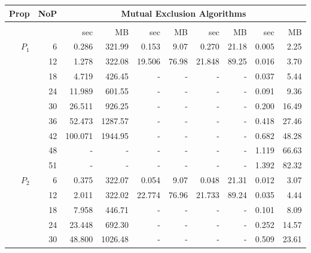 \begin{table}[h!]\scriptsize
	\centering
	\setlength{\tabcolsep}{2pt}
	\begin{tabular}{| r | r | r | r | r | r | r | r | r | r |}
		\hline
		\textbf{Prop} & \textbf{NoP} & \multicolumn{8}{c|}{Mutual Exclusion Algorithms} \\
		\hline
		{} & {} & \multicolumn{2}{c|}{\verds{}} & \multicolumn{2}{c|}{\nusmv{}} & \multicolumn{2}{c|}{\nuxmv{}} &  \multicolumn{2}{c|}{\sctl{}} \\
		\hline
		{} & {} & sec & MB & sec & MB & sec & MB &  sec & MB \\
		\hline
		\multirow{6}{*}{$P_1$} & 6 & 0.286 & 321.99 & 0.153 & 9.07 & 0.270 & 21.18 & 0.005 & 2.25 \\
		{} & 12 & 1.278 & 322.08 & 19.506 & 76.98 & 21.848 & 89.25 & 0.016 & 3.70  \\
		{} & 18 & 4.719 & 426.45 & - & - & - & - & 0.037 & 5.44  \\
		{} & 24 & 11.989 & 601.55 & - & - & - & - & 0.091 & 9.36  \\
		{} & 30 & 26.511 & 926.25 & - & - & - & - & 0.200 & 16.49  \\
		{} & 36 & 52.473 & 1287.57 & - & - & - & - & 0.418 & 27.46  \\
		{} & 42 & 100.071 & 1944.95 & - & - & - & - & 0.682 & 48.28  \\
		{} & 48 & - & - & - & - & - & - & 1.119 & 66.63  \\
		{} & 51 & - & - & - & - & - & - & 1.392 & 82.32  \\
		\hline
		\multirow{6}{*}{$P_2$} & 6 & 0.375 & 322.07 & 0.054 & 9.07 & 0.048 & 21.31 & 0.012 & 3.07  \\
		{} & 12 & 2.011 & 322.02 & 22.774 & 76.96 & 21.733 & 89.24 & 0.035 & 4.44  \\
		{} & 18 & 7.958 & 446.71 & - & - & - & - & 0.101 & 8.09  \\
		{} & 24 & 23.448 & 692.30 & - & - & - & - & 0.252 & 14.57  \\
		{} & 30 & 48.800 & 1026.48 & - & - & - & - & 0.509 & 23.61  \\

\end{tabular}
\end{table}

